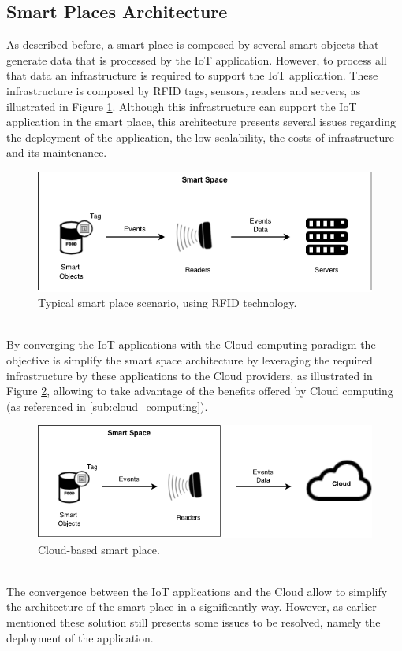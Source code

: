 \subsection{Smart Places Architecture}
\label{sub:smart_places_architecture}
As described before, a smart place is composed by several smart objects that generate
data that is processed by the IoT application. However, to process all that data an
infrastructure is required to support the IoT application. These infrastructure is composed
by RFID tags, sensors, readers and servers, as illustrated in Figure \ref{fig:smart-place}.
Although this infrastructure can support the IoT application in the smart place, this
architecture presents several issues regarding the deployment of the application, the low scalability,
the costs of infrastructure and its maintenance.
\pagebreak
\begin{figure}[h!]
  \centering
  \includegraphics[width=\textwidth]{./images/smart-space}
  \caption{Typical smart place scenario, using RFID technology.}
  \label{fig:smart-place}
\end{figure}\\
By converging the IoT applications with the Cloud computing paradigm the objective is simplify the
smart space architecture by leveraging the required infrastructure by these applications to
the Cloud providers, as illustrated in Figure \ref{fig:smart-place-cloud}, allowing to take
advantage of the benefits offered by Cloud computing (as referenced in \ref{sub:cloud_computing}).
\begin{figure}
  \centering
  \includegraphics[width=\textwidth]{./images/smart-space-cloud}
  \caption{Cloud-based smart place.}
  \label{fig:smart-place-cloud}
\end{figure}\\
The convergence between the IoT applications and the Cloud allow to simplify the
architecture of the smart place in a significantly way. However, as earlier mentioned
these solution still presents some issues to be resolved, namely the deployment of
the application.
